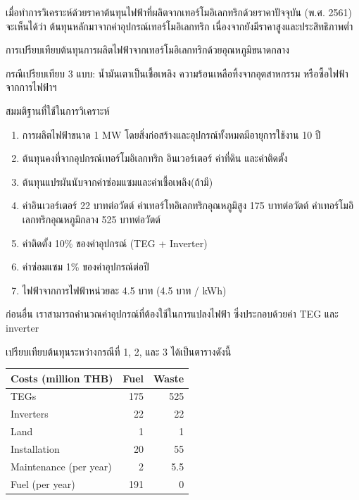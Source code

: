 \documentclass[a4paper,nobib,openany,10pt]{tufte-book}
\begin{document}
เมื่อทำการวิเคราะห์ด้วยราคาต้นทุนไฟฟ้าที่ผลิตจากเทอร์โมอิเลกทริกด้วยราคาปัจจุบัน
(พ.ศ. 2561) จะเห็นได้ว่า ต้นทุนหลักมาจากค่าอุปกรณ์เทอร์โมอิเลกทริก
เนื่องจากยังมีราคาสูงและประสิทธิภาพต่ำ

การเปรียบเทียบต้นทุนการผลิตไฟฟ้าจากเทอร์โมอิเลกทริกด้วยอุณหภูมิขนาดกลาง

กรณีเปรียบเทียบ 3 แบบ: น้ำมันเตาเป็นเชื้อเพลิง
ความร้อนเหลือทิ้งจากอุตสาหกรรม หรือซื้อไฟฟ้าจากการไฟฟ้าฯ

สมมติฐานที่ใช้ในการวิเคราะห์

\begin{enumerate}
\item การผลิตไฟฟ้าขนาด 1 MW โดยสิ่งก่อสร้างและอุปกรณ์ทั้งหมดมีอายุการใช้งาน
10 ปี

\item ต้นทุนคงที่จากอุปกรณ์เทอร์โมอิเลกทริก อินเวอร์เตอร์ ค่าที่ดิน
และค่าติดตั้ง

\item ต้นทุนแปรผันนับจากค่าซ่อมแซมและค่าเชื้อเพลิง(ถ้ามี)

\item ค่าอินเวอร์เตอร์ 22 บาทต่อวัตต์ ค่าเทอร์โทอิเลกทริกอุณหภูมิสูง 175
บาทต่อวัตต์ ค่าเทอร์โมอิเลกทริกอุณหภูมิกลาง 525 บาทต่อวัตต์

\item ค่าติดตั้ง 10\% ของค่าอุปกรณ์ (TEG + Inverter)

\item ค่าซ่อมแซม 1\% ของค่าอุปกรณ์ต่อปี

\item ไฟฟ้าจากการไฟฟ้าหน่วยละ 4.5 บาท (4.5 บาท / kWh)
\end{enumerate}

ก่อนอื่น เราสามารถคำนวณค่าอุปกรณ์ที่ต้องใช้ในการแปลงไฟฟ้า
ซึ่งประกอบด้วยค่า TEG และ inverter

เปรียบเทียบต้นทุนระหว่างกรณีที่ 1, 2, และ 3 ได้เป็นตารางดังนี้

\begin{center}
\begin{tabular}{lrr}
\toprule
Costs (million THB) & Fuel & Waste\\
\midrule
TEGs & 175 & 525\\
Inverters & 22 & 22\\
Land & 1 & 1\\
Installation & 20 & 55\\
Maintenance (per year) & 2 & 5.5\\
Fuel (per year) & 191 & 0\\
\bottomrule
\end{tabular}
\end{center}
\end{document}
